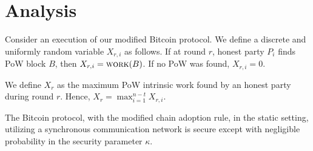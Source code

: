 \section{Analysis}

Consider an execution of our modified Bitcoin protocol.
We define a discrete and uniformly random variable $X_{r, i}$ as follows.
If at round $r$, honest party $P_i$ finds PoW block $B$, then $X_{r, i} = \textsc{work}(B)$.
If no PoW was found, $X_{r, i} = 0$.

We define $X_{r}$ as the maximum PoW intrinsic work found by an honest party during
round $r$. Hence, $X_{r} = \max_{i = 1}^{n - t}{X_{r,i}}$.

\begin{conjecture}[]
  The Bitcoin protocol, with the modified chain adoption rule, in
  the static setting, utilizing a synchronous communication network is
  secure except with negligible probability in the security parameter $\kappa$.
\end{conjecture}
